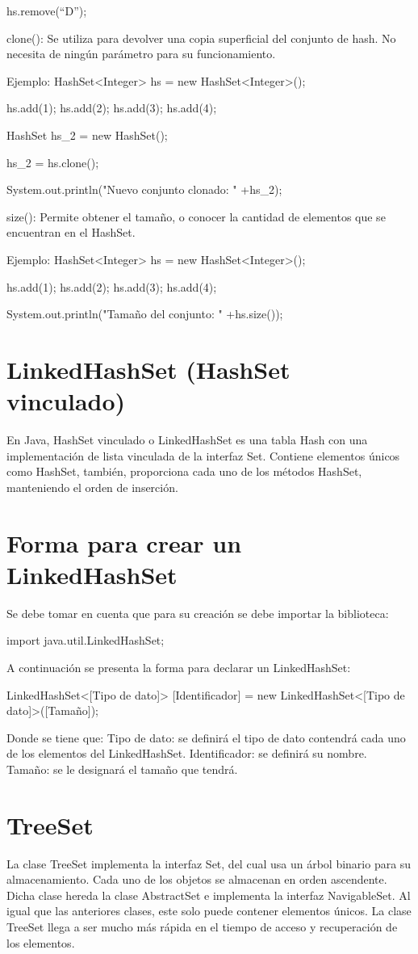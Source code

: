 \documentclass[12pt, letterpaper]{article} %
\begin{document}
hs.remove(“D”);


clone():
Se utiliza para devolver una copia superficial del conjunto de hash. No necesita de ningún parámetro para su funcionamiento.

Ejemplo:
HashSet<Integer> hs = new HashSet<Integer>();

hs.add(1);
hs.add(2);
hs.add(3);
hs.add(4);

HashSet hs_2  = new HashSet();

hs_2 = hs.clone();

System.out.println("Nuevo conjunto clonado: " +hs_2);


size():
Permite obtener el tamaño, o conocer la cantidad de elementos que se encuentran en el HashSet.

Ejemplo:
HashSet<Integer> hs = new HashSet<Integer>();

hs.add(1);
hs.add(2);
hs.add(3);
hs.add(4);

System.out.println("Tamaño del conjunto: " +hs.size());


\section*{LinkedHashSet (HashSet vinculado)}
En Java, HashSet vinculado o LinkedHashSet es una tabla Hash con una implementación de lista vinculada de la interfaz Set. Contiene elementos únicos como HashSet, también, proporciona cada uno de los métodos HashSet, manteniendo el orden de inserción.

\section*{Forma para crear un LinkedHashSet}
Se debe tomar en cuenta que para su creación se debe importar la biblioteca:

import java.util.LinkedHashSet;

A continuación se presenta la forma para declarar un LinkedHashSet:

LinkedHashSet<[Tipo de dato]> [Identificador] = new LinkedHashSet<[Tipo de dato]>([Tamaño]);

Donde se tiene que:
Tipo de dato: se definirá el tipo de dato contendrá cada uno de los elementos del LinkedHashSet.
Identificador: se definirá su nombre.
Tamaño: se le designará el tamaño que tendrá.


\section*{TreeSet}
La clase TreeSet implementa la interfaz Set, del cual usa un árbol binario para su almacenamiento. Cada uno de los objetos se almacenan en orden ascendente. Dicha clase hereda la clase AbstractSet e implementa la interfaz NavigableSet. Al igual que las anteriores clases, este solo puede contener elementos únicos. La clase TreeSet llega a ser mucho más rápida en el tiempo de acceso y recuperación de los elementos.
\end{document}
